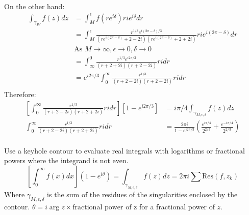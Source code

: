 \begin{example}
    On the other hand:
    \begin{align*}
        \int_{\gamma_{IV}} f(z)dz & = \int_{M}^{\epsilon} f(r e^{i\delta})r i e^{i\delta} dr                                                                                              \\
                                  & = \int_{M}^{\epsilon} \frac{r^{1/3}e^{i(2\pi -\delta)/3}}{(r e^{i(2\pi -\delta)} + 2 - 2i)(r e^{i(2\pi -\delta)} + 2 + 2i)}r i e^{i(2\pi -\delta)} dr \\
                                  & \text{As } M \to \infty, \epsilon \to 0, \delta \to 0                                                                                                 \\
                                  & = \int_{\infty}^{0} \frac{r^{1/3}e^{i2\pi/3}}{(r + 2 + 2i)(r + 2 - 2i)}r i dr                                                                         \\
                                  & = e^{i2\pi/3}\int_{0}^{\infty} \frac{r^{1/3}}{(r + 2 - 2i)(r + 2 + 2i)}r i dr                                                                         \\
    \end{align*}
    Therefore:
    \begin{align*}
        \left[\int_{0}^{\infty} \frac{r^{1/3}}{(r + 2 - 2i)(r + 2 + 2i)}r i dr\right]\left[1 - e^{i2\pi/3}\right] & = i\pi/4\int_{\gamma_{M,\epsilon,\delta}} f(z)dz                                                         \\
        \int_{0}^{\infty} \frac{r^{1/3}}{(r + 2 - 2i)(r + 2 + 2i)}r i dr                                          & = \frac{2\pi i}{1 - e^{i2\pi/3}} \left( \frac{e^{i\pi/4}}{2^{2/3}} + \frac{e^{-i\pi/4}}{2^{2/3}} \right) \\
    \end{align*}
\end{example}

\begin{proposition}
    Use a keyhole contour to evaluate real integrals with logarithms or fractional powers where the integrand is not even.
    $$\left[\int_{0}^{\infty} f(x)dx\right](1 - e^{i\theta}) = \int_{\gamma_{M,\epsilon,\delta}} f(z)dz = 2\pi i \sum \text{Res}(f,z_k)$$
    Where $\gamma_{M,\epsilon,\delta}$ is the sum of the residues of the singularities enclosed by the contour. $\theta = i\arg z \times \text{fractional power of z}$ for a fractional power of $z$.
\end{proposition}


